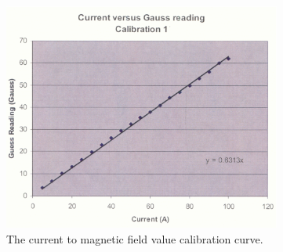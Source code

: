 \begin{figure}
 \hspace{0.5cm}
 \begin{centering}
  \includegraphics[height=7.5cm]{Magnetic-shielding/mag_calibration.eps}
 \vspace{0.5cm}
 \caption{\small{The current to magnetic field value calibration curve.}}
\label{magcalibration}
\end{centering}
 \end{figure}

